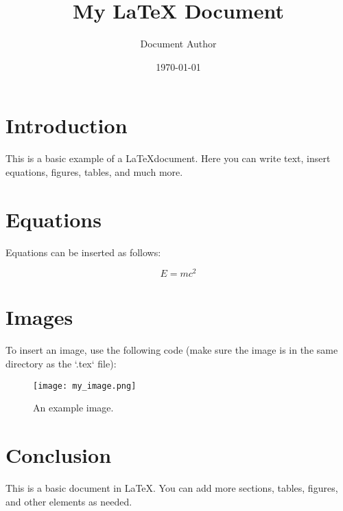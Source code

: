 \documentclass[a4paper,12pt]{article}
\title{My LaTeX Document}
\author{Document Author}
\date{\today}  %
\begin{document}
\maketitle

\section{Introduction}
This is a basic example of a \LaTeX document. Here you can write text, insert equations, figures, tables, and much more.

\section{Equations}
Equations can be inserted as follows:

\[
E = mc^2
\]

\section{Images}
To insert an image, use the following code (make sure the image is in the same directory as the `.tex` file):

\begin{figure}[h!]
    \centering
    \texttt{[image: my\_image.png]}
    \caption{An example image.}
\end{figure}

\section{Conclusion}
This is a basic document in \LaTeX. You can add more sections, tables, figures, and other elements as needed.
\end{document}
